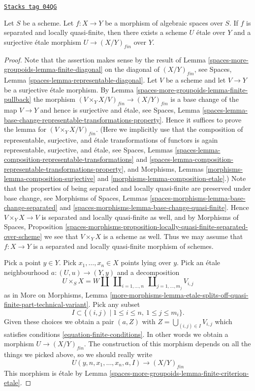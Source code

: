 \begin{lemma}
\label{spaces-more-groupoids-lemma-finite-surjective-etale-cover}
\href{https://stacks.math.columbia.edu/tag/04QG}{\texttt{Stacks tag 04QG}}

Let $S$ be a scheme.
Let $f : X \to Y$ be a morphism of algebraic spaces over $S$.
If $f$ is separated and locally quasi-finite, then there exists a
scheme $U$ \'etale over $Y$ and a surjective \'etale morphism
$U \to (X/Y)_{fin}$ over $Y$.
\end{lemma}

\begin{proof}
Note that the assertion makes sense by the result of
Lemma \ref{spaces-more-groupoids-lemma-finite-diagonal}
on the diagonal of $(X/Y)_{fin}$, see
Spaces, Lemma \ref{spaces-lemma-representable-diagonal}.
Let $V$ be a scheme and let $V \to Y$ be a surjective \'etale morphism. By
Lemma \ref{spaces-more-groupoids-lemma-finite-pullback}
the morphism $(V \times_Y X/V)_{fin} \to (X/Y)_{fin}$ is
a base change of the map $V \to Y$ and hence is surjective and \'etale, see
Spaces,
Lemma \ref{spaces-lemma-base-change-representable-transformations-property}.
Hence it suffices to prove the lemma for $(V \times_Y X/V)_{fin}$.
(Here we implicitly use that the composition of representable, surjective, and
\'etale transformations of functors is again representable, surjective, and
\'etale, see
Spaces, Lemmas \ref{spaces-lemma-composition-representable-transformations} and
\ref{spaces-lemma-composition-representable-transformations-property}, and
Morphisms, Lemmas \ref{morphisms-lemma-composition-surjective} and
\ref{morphisms-lemma-composition-etale}.)
Note that the properties of being separated and locally quasi-finite
are preserved under base change, see
Morphisms of Spaces,
Lemmas \ref{spaces-morphisms-lemma-base-change-separated} and
\ref{spaces-morphisms-lemma-base-change-quasi-finite}.
Hence $V \times_Y X \to V$ is separated and locally quasi-finite as well,
and by
Morphisms of Spaces, Proposition
\ref{spaces-morphisms-proposition-locally-quasi-finite-separated-over-scheme}
we see that $V \times_Y X$ is a scheme as well.
Thus we may assume that $f : X \to Y$ is a separated and locally quasi-finite
morphism of schemes.

\medskip\noindent
Pick a point $y \in Y$. Pick $x_1, \ldots, x_n \in X$ points
lying over $y$. Pick an \'etale neighbourhood $a : (U, u) \to (Y, y)$ and a
decomposition
$$
U \times_S X =
W \amalg
\ \coprod\nolimits_{i = 1, \ldots, n}
\ \coprod\nolimits_{j = 1, \ldots, m_j}
V_{i, j}
$$
as in
More on Morphisms, Lemma
\ref{more-morphisms-lemma-etale-splits-off-quasi-finite-part-technical-variant}.
Pick any subset
$$
I \subset \{(i, j) \mid 1 \leq i \leq n, \ 1 \leq j \leq m_i\}.
$$
Given these choices we obtain a pair $(a, Z)$ with
$Z = \bigcup_{(i, j) \in I} V_{i, j}$
which satisfies conditions \ref{equation-finite-conditions}. In other words
we obtain a morphism $U \to (X/Y)_{fin}$. The construction of this morphism
depends on all the things we picked above, so we should really write
$$
U(y, n, x_1, \ldots, x_n, a, I) \longrightarrow (X/Y)_{fin}
$$
This morphism is \'etale by Lemma \ref{spaces-more-groupoids-lemma-finite-criterion-etale}.


\end{proof}
